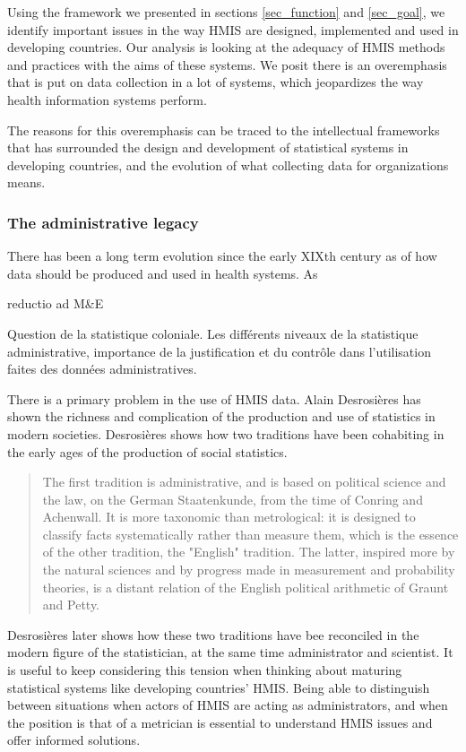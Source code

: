 \documentclass[a4paper,11pt,final,twoside]{article}
\begin{document}
Using the framework we presented in sections \ref{sec_function} and \ref{sec_goal}, we identify important issues in the way HMIS are designed, implemented and used in developing countries. Our analysis is looking at the adequacy of HMIS methods and practices with the aims of these systems. We posit there is an overemphasis that is put on data collection in a lot of systems, which jeopardizes the way health information systems perform.

The reasons for this overemphasis can be traced to the intellectual frameworks that has surrounded the design and development of statistical systems in developing countries, and the evolution of what collecting data for organizations means.

\subsubsection{The administrative legacy}

There has been a long term evolution since the early XIXth century as of how data should be produced and used in health systems. As


reductio ad M\&E


Question de la statistique coloniale. Les différents niveaux de la statistique administrative, importance de la justification et du contrôle dans l'utilisation faites des données administratives.

There is a primary problem in the use of HMIS data. Alain Desrosières has shown the richness and complication of the production and use of statistics in modern societies. Desrosières shows how two traditions have been cohabiting in the early ages of the production of social statistics\cite{admin_savant}.

\begin{quote}
The first tradition is administrative, and is based on political science and the law, on the German Staatenkunde, from the time of Conring and Achenwall. It is more taxonomic than metrological: it is designed to classify facts systematically rather than measure them, which is the essence of the other tradition, the "English" tradition. The latter, inspired more by the natural sciences and by progress made in measurement and probability theories, is a distant relation of the English political arithmetic of Graunt and Petty.
\end{quote}

Desrosières later shows how these two traditions have bee reconciled in the modern figure of the statistician, at the same time administrator and scientist. It is useful to keep considering this tension when thinking about maturing statistical systems like developing countries' HMIS. Being able to distinguish between situations when actors of HMIS are acting as administrators, and when the position is that of a metrician is essential to understand HMIS issues and offer informed solutions.
\end{document}
